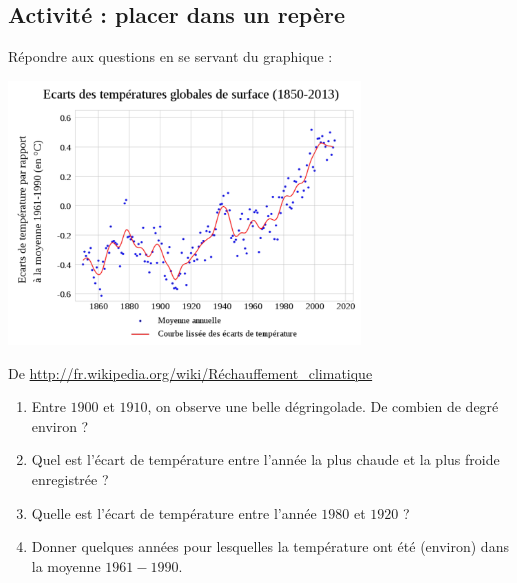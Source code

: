 
\subsection*{Activité : placer dans un repère}

Répondre aux questions en se servant du graphique :

\includegraphics[width=0.7\textwidth]{EcartsTempSurface2013.pdf}

De \url{http://fr.wikipedia.org/wiki/Réchauffement_climatique}


\begin{enumerate}
    \item
        Entre \( 1900\) et \( 1910\), on observe une belle dégringolade. De combien de degré environ ?
    \item
        Quel est l'écart de température entre l'année la plus chaude et la plus froide enregistrée ?
    \item
        Quelle est l'écart de température entre l'année \( 1980\) et \( 1920\) ?
    \item
        Donner quelques années pour lesquelles la température ont été (environ) dans la moyenne \( 1961-1990\).
\end{enumerate}

